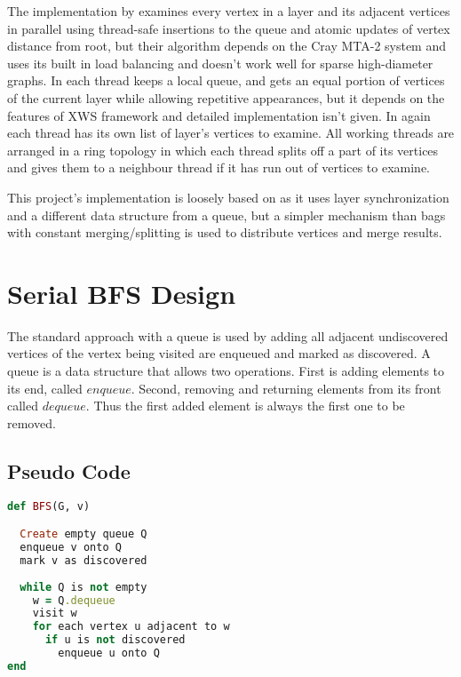 \documentclass{report}
\theoremstyle{plain}
\theoremstyle{definition}
\theoremstyle{remark}
\begin{document}
The implementation by \cite{bader2006designing} examines every vertex in a layer and its adjacent vertices in parallel using thread-safe insertions to the queue and atomic updates of vertex distance from root, but their algorithm depends on the Cray MTA-2 system and uses its built in load balancing and doesn't work well for sparse high-diameter graphs.
In \cite{cong2008solving} each thread keeps a local queue, and gets an equal portion of vertices of the current layer while allowing repetitive appearances, but it depends on the features of XWS framework and detailed implementation isn't given.
In \cite{zhang2006parallel} again each thread has its own list of layer's vertices to examine. All working threads are arranged in a ring topology in which each thread splits off a part of its vertices and gives them to a neighbour thread if it has run out of vertices to examine.

This project's implementation is loosely based on \cite{Leiserson} as it uses layer synchronization and a different data structure from a queue, but a simpler mechanism than bags with constant merging/splitting is used to distribute vertices and merge results.

\section{Serial BFS Design}
 
The standard approach with a queue is used by adding all adjacent undiscovered vertices of the vertex being visited are enqueued and marked as discovered. A queue is a data structure that allows two operations. First is adding elements to its end, called $enqueue$. Second, removing and returning elements from its front called $dequeue$. Thus the first added element is always the first one to be removed.

\subsection*{Pseudo Code}

\begin{lstlisting}[language=Ruby]
def BFS(G, v)

  Create empty queue Q
  enqueue v onto Q
  mark v as discovered
  
  while Q is not empty
    w = Q.dequeue
    visit w
    for each vertex u adjacent to w
      if u is not discovered
        enqueue u onto Q
end
\end{lstlisting}
\end{document}
